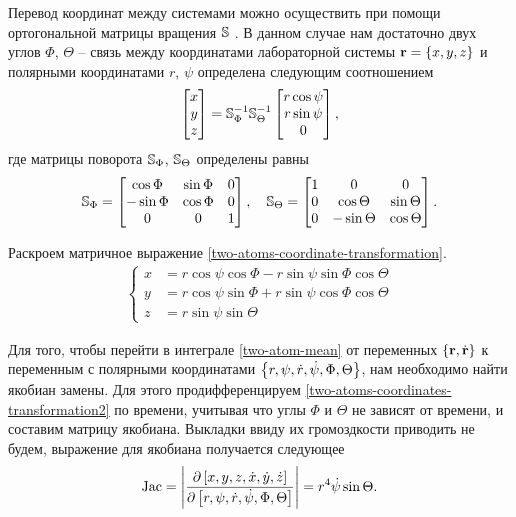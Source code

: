 Перевод координат между системами можно осуществить при помощи ортогональной матрицы вращения $\mathbb{S}$ \cite{goldstein}. В данном случае нам достаточно двух углов $\Phi$, $\Theta$ -- связь между координатами лабораторной системы $\mathbf{r} = \left\{ x, y, z \right\}$ и полярными координатами $r$, $\psi$ определена следующим соотношением
\begin{gather}
    \begin{bmatrix}
        x \\ y \\ z
    \end{bmatrix} = \mathbb{S}_\Phi^{-1} \mathbb{S}_\Theta^{-1} 
    \begin{bmatrix}
        r \cos \psi \\ r \sin \psi \\ 0
    \end{bmatrix}, \label{two-atoms-coordinate-transformation}
\end{gather}
% 
где матрицы поворота $\mathbb{S}_\Phi$, $\mathbb{S}_\Theta$ определены равны
\begin{gather}
    \mathbb{S}_\Phi = 
    \begin{bmatrix}
        \cos \Phi & \sin \Phi & 0 \\
       -\sin \Phi & \cos \Phi & 0 \\
      0 & 0 & 1
    \end{bmatrix}, \quad
    \mathbb{S}_\Theta = 
    \begin{bmatrix}
        1 & 0 & 0 \\
        0 & \cos \Theta & \sin \Theta \\
        0 & -\sin \Theta & \cos \Theta
    \end{bmatrix}.
\end{gather}

Раскроем матричное выражение \eqref{two-atoms-coordinate-transformation}. 
\begin{gather}
    \left\{
        \begin{aligned}
            x &= r \cos \psi \cos \Phi - r \sin \psi \sin \Phi \cos \Theta \\
            y &= r \cos \psi \sin \Phi + r \sin \psi \cos \Phi \cos \Theta \\
            z &= r \sin \psi \sin \Theta
        \end{aligned}
    \right. \label{two-atoms-coordinates-transformation2}
\end{gather}

Для того, чтобы перейти в интеграле \eqref{two-atom-mean} от переменных $\left\{ \mathbf{r}, \dot{\mathbf{r}} \right\}$ к переменным с полярными координатами $\left\{ r, \psi, \dot{r}, \dot{\psi}, \Phi, \Theta \right\}$, нам необходимо найти якобиан замены. Для этого продифференцируем \eqref{two-atoms-coordinates-transformation2} по времени, учитывая что углы $\Phi$ и $\Theta$ не зависят от времени, и составим матрицу якобиана. Выкладки ввиду их громоздкости приводить не будем, выражение для якобиана получается следующее 
\begin{gather}
    \text{Jac} = \Bigg\vert \frac{\partial \left[ x, y, z, \dot{x}, \dot{y}, \dot{z} \right]}{\partial \left[ r, \psi, \dot{r}, \dot{\psi}, \Phi, \Theta \right]} \Bigg\vert = r^4 \dot{\psi} \sin \Theta. \label{two-atoms-jacobian}
\end{gather}

